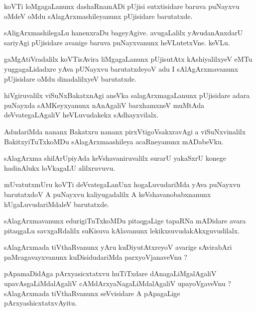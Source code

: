 \documentclass{article}
\begin{document}
\begin{mn}%
koVTi loMgagaLanunx dashaRnamADi pUjisi sutxtisidare baruva puNayxvu oMdeV oMdu 
sAlagArxmashileyanunx pUjisidare barutatxde.
\end{mn}

\begin{mn}%
sAligArxmashilegaLu hanenxraDu bageyAgive. avugaLalilx yAvudanAnxdarU sariyAgi pUjisidare avanige 
baruva puNayxvanunx heVLutetxVne. keVLu.
\end{mn}

\begin{mn}%
gaMgAtiVradalilx koVTisAvira liMgagaLanunx pUjisutAtx kAshiyalilxyeV eMTu yuggagaLidadxre yAva 
pUNayxvu barutatxdeyoV adu I sAlAgArxmavanunx pUjisidare oMdu dinadalilxyeV barutatxde.
\end{mn}

\begin{mn}%
hiVgiruvalilx viSuNxBakatxnAgi aneVka salagArxmagaLanunx pUjisidare adara puNayxda sAMKeyxyanunx 
nAnAgaliV barxhamxneV muMtAda deVvategaLAgaliV heVLuvudakekx sAdhayxvilalx.
\end{mn}

\begin{mn}%
AdudariMda nananx Bakatxru nananx pirxVtigoVsakxravAgi a viSuNxvinalilx BakitxyiTuTxkoMDu 
sAlagArxmaashileya acaRneyanunx mADabeVku.
\end{mn}

\begin{mn}%
sAlagArxma shilArUpiyAda keVshavaniruvalilx surarU yakaSxrU konege hadinAlukx loVkagaLU alilxruvuvu.
\end{mn}

\begin{mn}%
mUvatutxmUru koVTi deVvategaLanUnx hogaLuvudariMda yAva puNayxvu barutatxdoV A puNayxvu 
kaliyugadalilx A keVshavanobabxnanunx hUgaLuvudariMdaleV barutatxde.
\end{mn}

\begin{mn}%
sAlagArxmavanunx edurigiTuTxkoMDu pitaqgaLige tapaRNa mADidare avara pitaqgaLu savxgaRdalilx 
suKisuva kAlavanunx lekikxsuvudakAkxguvudilalx.
\end{mn}

\begin{mn}%
sAlagArxmada tiVthaRvanunx yAru kuDiyutAtxreyoV avarige sAvirabAri paMcagavayxvanunx 
kuDisidudariMda parxyoVjanaveVnu ?
\end{mn}

\begin{mn}%
pApamaDidAga pArxyasicxtatxvu huTiTxdare dAnagaLiMgalAgaliV upavAsgaLiMdalAgaliV 
cAMdArxyaNagaLiMdalAgaliV upayoVgaveVnu ? sAlagArxmada tiVthaRvanunx seVvisidare A pApagaLige 
pArxyashicxtatxvAyitu.
\end{mn}
\end{document}
